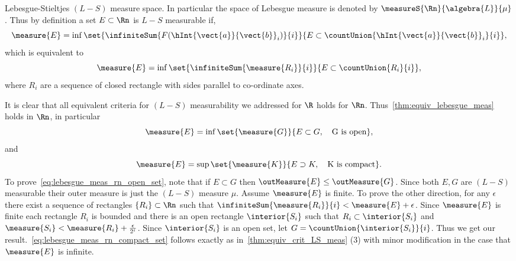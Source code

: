 Lebesgue-Stieltjes $(L-S)$ measure space. In particular the space of Lebesgue measure is denoted by
$\measureS{\Rn}{\algebra{L}}{\mu}$. Thus by definition a set $E\subset \Rn$ is $L-S$ measurable if,
\begin{equation*}
    \measure{E} = \inf\set{\infiniteSum{F({\hInt{\vect{a}}{\vect{b}}}_{i})}{i}}{E \subset
	\countUnion{{\hInt{\vect{a}}{\vect{b}}}_i}{i}},
\end{equation*}
which is equivalent to
\begin{equation*}
    \measure{E} = \inf\set{\infiniteSum{\measure{R_i}}{i}}{E \subset
	\countUnion{R_i}{i}},
\end{equation*}
where $R_i$ are a sequence of closed rectangle with sides parallel to co-ordinate axes. 


It is clear that all equivalent criteria for $(L-S)$ measurability we addressed for $\R$ holds for
$\Rn$. Thus~\ref{thm:equiv_lebesgue_meas} holds in $\Rn$, in particular
\begin{equation}\label{eq:lebesgue_meas_rn_open_set}
    \measure{E} = \inf\set{\measure{G}}{E\subset G,\quad\text{G is open}},
\end{equation}
and 
\begin{equation}\label{eq:lebesgue_meas_rn_compact_set}
    \measure{E} = \sup\set{\measure{K}}{E\supset K,\quad\text{K is compact}}.
\end{equation}
To prove~\ref{eq:lebesgue_meas_rn_open_set}, note that if $E \subset G$ then $\outMeasure{E} \leq
\outMeasure{G}$. Since both $E,G$ are $(L-S)$ measurable their outer measure is just the $(L-S)$
measure $\mu$. Assume $\measure{E}$ is finite.  
To prove the other direction, for any $\epsilon$ there exist a sequence of rectangles
$\lbrace R_i \rbrace \subset \Rn$ such that $\infiniteSum{\measure{R_i}}{i} < \measure{E} +
\epsilon$. Since $\measure{E}$ is finite each rectangle $R_i$ is bounded and there is an open
rectangle $\interior{S_i}$ such that $R_i \subset \interior{S_i}$ and $\measure{{S_i}} <
\measure{R_i} + \frac{\epsilon}{2^i}$. Since $\interior{S_i}$ is an open set, let $G =
\countUnion{\interior{S_i}}{i}$. Thus we get our result.~\ref{eq:lebesgue_meas_rn_compact_set}
follows exactly as in~\ref{thm:equiv_crit_LS_meas} (3) with minor modification in the case that $\measure{E}$
is infinite.


